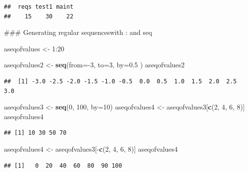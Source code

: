 \documentclass[]{book}
\newenvironment{Shaded}{\begin{snugshade}}{\end{snugshade}}
\newcommand{\KeywordTok}[1]{\textcolor[rgb]{0.13,0.29,0.53}{\textbf{{#1}}}}
\newcommand{\DataTypeTok}[1]{\textcolor[rgb]{0.13,0.29,0.53}{{#1}}}
\newcommand{\DecValTok}[1]{\textcolor[rgb]{0.00,0.00,0.81}{{#1}}}
\newcommand{\FloatTok}[1]{\textcolor[rgb]{0.00,0.00,0.81}{{#1}}}
\newcommand{\StringTok}[1]{\textcolor[rgb]{0.31,0.60,0.02}{{#1}}}
\newcommand{\NormalTok}[1]{{#1}}
\begin{document}
\begin{verbatim}
##  reqs test1 maint 
##    15    30    22
\end{verbatim}

\begin{Shaded}
\begin{Highlighting}[]
\NormalTok{### Generating regular sequenceswith  : and seq}

\NormalTok{aseqofvalues <-}\StringTok{ }\DecValTok{1}\NormalTok{:}\DecValTok{20}

\NormalTok{aseqofvalues2 <-}\StringTok{ }\KeywordTok{seq}\NormalTok{(}\DataTypeTok{from=}\NormalTok{-}\DecValTok{3}\NormalTok{, }\DataTypeTok{to=}\DecValTok{3}\NormalTok{, }\DataTypeTok{by=}\FloatTok{0.5} \NormalTok{)}
\NormalTok{aseqofvalues2}
\end{Highlighting}
\end{Shaded}

\begin{verbatim}
##  [1] -3.0 -2.5 -2.0 -1.5 -1.0 -0.5  0.0  0.5  1.0  1.5  2.0  2.5  3.0
\end{verbatim}

\begin{Shaded}
\begin{Highlighting}[]
\NormalTok{aseqofvalues3 <-}\StringTok{ }\KeywordTok{seq}\NormalTok{(}\DecValTok{0}\NormalTok{, }\DecValTok{100}\NormalTok{, }\DataTypeTok{by=}\DecValTok{10}\NormalTok{)}
\NormalTok{aseqofvalues4 <-}\StringTok{ }\NormalTok{aseqofvalues3[}\KeywordTok{c}\NormalTok{(}\DecValTok{2}\NormalTok{, }\DecValTok{4}\NormalTok{, }\DecValTok{6}\NormalTok{, }\DecValTok{8}\NormalTok{)]}
\NormalTok{aseqofvalues4}
\end{Highlighting}
\end{Shaded}

\begin{verbatim}
## [1] 10 30 50 70
\end{verbatim}

\begin{Shaded}
\begin{Highlighting}[]
\NormalTok{aseqofvalues4 <-}\StringTok{ }\NormalTok{aseqofvalues3[-}\KeywordTok{c}\NormalTok{(}\DecValTok{2}\NormalTok{, }\DecValTok{4}\NormalTok{, }\DecValTok{6}\NormalTok{, }\DecValTok{8}\NormalTok{)]}
\NormalTok{aseqofvalues4}
\end{Highlighting}
\end{Shaded}

\begin{verbatim}
## [1]   0  20  40  60  80  90 100
\end{verbatim}
\end{document}
